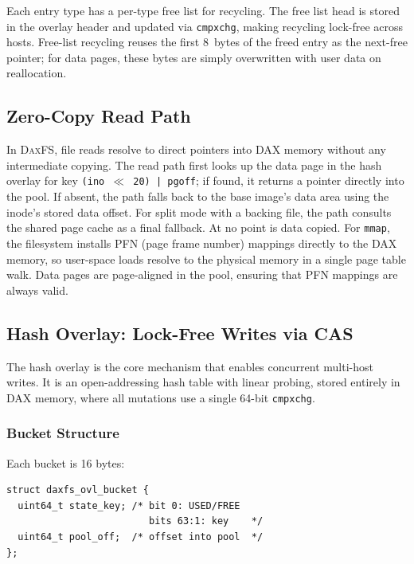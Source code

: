 \documentclass[letterpaper,twocolumn,10pt]{article}
\newcommand{\daxfs}{\textsc{DaxFS}\xspace}
\begin{document}
Each entry type has a per-type free list for recycling.  The free list
head is stored in the overlay header and updated via \texttt{cmpxchg},
making recycling lock-free across hosts.  Free-list recycling reuses
the first 8~bytes of the freed entry as the next-free pointer; for
data pages, these bytes are simply overwritten with user data on
reallocation.

\subsection{Zero-Copy Read Path}
\label{sec:zero-copy}

In \daxfs, file reads resolve to direct pointers into DAX memory
without any intermediate copying.  The read path first looks up the
data page in the hash overlay for key
\texttt{(ino $\ll$ 20) | pgoff}; if found, it returns a pointer
directly into the pool.  If absent, the path falls back to the base
image's data area using the inode's stored data offset.  For split
mode with a backing file, the path consults the shared page cache as a
final fallback.  At no point is data copied.  For \texttt{mmap}, the filesystem
installs PFN (page frame number) mappings directly to the DAX memory,
so user-space loads resolve to the physical memory in a single page
table walk.  Data pages are page-aligned in the pool, ensuring that
PFN mappings are always valid.

\subsection{Hash Overlay: Lock-Free Writes via CAS}
\label{sec:overlay}

The hash overlay is the core mechanism that enables concurrent
multi-host writes.  It is an open-addressing hash table with linear
probing, stored entirely in DAX memory, where all mutations use a
single 64-bit \texttt{cmpxchg}.

\subsubsection{Bucket Structure}

Each bucket is 16 bytes:

\begin{lstlisting}
struct daxfs_ovl_bucket {
  uint64_t state_key; /* bit 0: USED/FREE
                         bits 63:1: key    */
  uint64_t pool_off;  /* offset into pool  */
};
\end{lstlisting}
\end{document}
